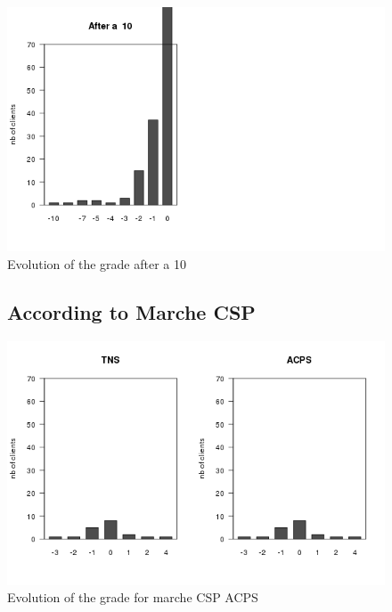 \documentclass[a4paper, 11pt]{article}
\begin{document}
        \begin{figure}[!ht]
                \centering
                \includegraphics[height = 10 cm]{Remi/Evolution_of_the_grade_after_a_10.png}
                \caption{Evolution of the grade after a 10}
                \label{fig:e_10}
        \end{figure}

        \begin{figure}[!ht]
				\subsection{According to Marche CSP}
                \centering
                \includegraphics[height = 10 cm]{Remi/Evolution_of_the_grade_for_marche_CSP_ACPS.png}
                \caption{Evolution of the grade for marche CSP ACPS}
                \label{fig:e_CSP_ACPS}
        \end{figure}
\end{document}
